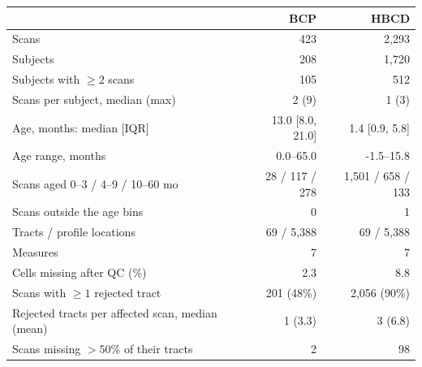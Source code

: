 \begin{tabular}{lrr}
\toprule
 & BCP & HBCD \\
\midrule
Scans & 423 & 2,293 \\
Subjects & 208 & 1,720 \\
Subjects with $\geq 2$ scans & 105 & 512 \\
Scans per subject, median (max) & 2 (9) & 1 (3) \\
Age, months: median [IQR] & 13.0 [8.0, 21.0] & 1.4 [0.9, 5.8] \\
Age range, months & 0.0--65.0 & -1.5--15.8 \\
Scans aged 0--3 / 4--9 / 10--60 mo & 28 / 117 / 278 & 1,501 / 658 / 133 \\
Scans outside the age bins & 0 & 1 \\
Tracts / profile locations & 69 / 5,388 & 69 / 5,388 \\
Measures & 7 & 7 \\
\midrule
Cells missing after QC (\%) & 2.3 & 8.8 \\
Scans with $\geq 1$ rejected tract & 201 (48\%) & 2,056 (90\%) \\
Rejected tracts per affected scan, median (mean) & 1 (3.3) & 3 (6.8) \\
Scans missing $>50\%$ of their tracts & 2 & 98 \\
\bottomrule
\end{tabular}
